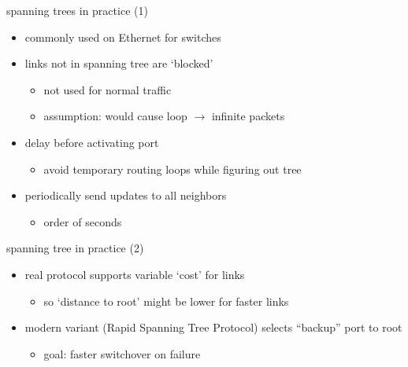 \begin{frame}{spanning trees in practice (1)}
    \begin{itemize}
    \item commonly used on Ethernet for switches
    \item links not in spanning tree are `blocked'
        \begin{itemize}
        \item not used for normal traffic
        \item assumption: would cause loop $\rightarrow$ infinite packets
        \end{itemize}
    \item delay before activating port
        \begin{itemize}
        \item avoid temporary routing loops while figuring out tree
        \end{itemize}
    \item periodically send updates to all neighbors
        \begin{itemize}
        \item order of seconds
        \end{itemize}
    \end{itemize}
\end{frame}

\begin{frame}{spanning tree in practice (2)}
    \begin{itemize}
    \item real protocol supports variable `cost' for links
        \begin{itemize}
        \item so `distance to root' might be lower for faster links
        \end{itemize}
    \item modern variant (Rapid Spanning Tree Protocol) selects ``backup'' port to root 
        \begin{itemize}
        \item goal: faster switchover on failure
        \end{itemize}
    \end{itemize}
\end{frame}
